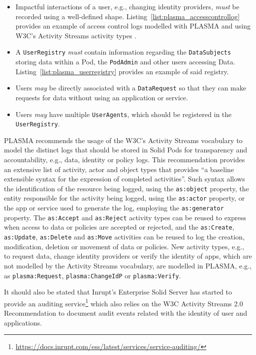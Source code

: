 \begin{itemize}
    \item Impactful interactions of a user, e.g., changing identity providers, \textit{must} be recorded using a well-defined shape. Listing~\ref{list:plasma_accesscontrollog} provides an example of access control logs modelled with PLASMA and using W3C's Activity Streams activity types \citep{snell_activity_2017}.
    \item A \texttt{UserRegistry} \textit{must} contain information regarding the \texttt{DataSubjects} storing data within a Pod, the \texttt{PodAdmin} and other users accessing Data. Listing~\ref{list:plasma_userregistry} provides an example of said registry.
    \item Users \textit{may} be directly associated with a \texttt{DataRequest} so that they can make requests for data without using an application or service.
    \item Users \textit{may} have multiple \texttt{UserAgents}, which should be registered in the \texttt{UserRegistry}.
\end{itemize}

PLASMA recommends the usage of the W3C's Activity Streams vocabulary \citep{snell_activity_2017} to model the distinct logs that should be stored in Solid Pods for transparency and accountability, e.g., data, identity or policy logs.
This recommendation provides an extensive list of activity, actor and object types that provides ``a baseline extensible syntax for the expression of completed activities''.
Such syntax allows the identification of the resource being logged, using the \texttt{as:object} property, the entity responsible for the activity being logged, using the \texttt{as:actor} property, or the app or service used to generate the log, employing the \texttt{as:generator} property.
The \texttt{as:Accept} and \texttt{as:Reject} activity types can be reused to express when access to data or policies are accepted or rejected, and the \texttt{as:Create}, \texttt{as:Update}, \texttt{as:Delete} and \texttt{as:Move} activities can be reused to log the creation, modification, deletion or movement of data or policies.
New activity types, e.g., to request data, change identity providers or verify the identity of apps, which are not modelled by the Activity Streams vocabulary, are modelled in PLASMA, e.g., as \texttt{plasma:Request}, \texttt{plasma:ChangeIdP} or \texttt{plasma:Verify}.

It should also be stated that Inrupt's Enterprise Solid Server has started to provide an auditing service\footnote{\url{https://docs.inrupt.com/ess/latest/services/service-auditing/}} which also relies on the W3C Activity Streams 2.0 Recommendation \citep{snell_activity_2017} to document audit events related with the identity of user and applications.

